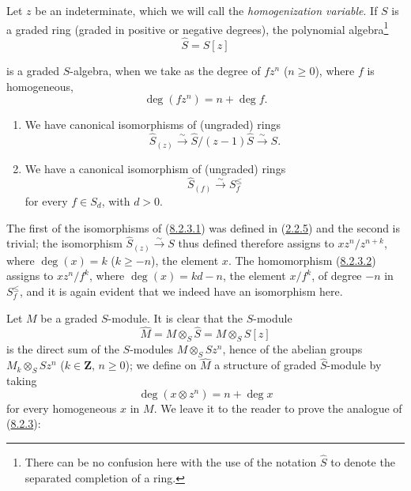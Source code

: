 \begin{env}[8.2.2]
\label{II.8.2.2}
Let $z$ be an indeterminate, which we will call the \emph{homogenization
variable}. If $S$ is a graded ring (graded in positive or
negative degrees), the polynomial algebra\footnote{There can be no
confusion here with the use of the notation $\widehat{S}$ to denote the separated
completion of a ring.}
\begin{equation}
\label{II.8.2.2.1}
  \widehat{S}=S[z]
\tag{8.2.2.1}
\end{equation}

is a graded $S$-algebra, when we take as the degree of $fz^n$ ($n\geq0$), where
$f$ is homogeneous,
\begin{equation}
\label{II.8.2.2.2}
  \deg(fz^n)=n+\deg f.
\tag{8.2.2.2}
\end{equation}
\end{env}

\begin{lemma}[8.2.3]
\label{II.8.2.3}
\begin{enumerate}
\item[\rm(i)] We have canonical isomorphisms of (ungraded) rings
\begin{equation}
\label{II.8.2.3.1}
  \widehat{S}_{(z)}\xrightarrow{\sim}
  \widehat{S}/(z-1)\widehat{S}\xrightarrow{\sim}S.
\tag{8.2.3.1}
\end{equation}
\item[\rm(ii)] We have a canonical isomorphism of (ungraded) rings
\begin{equation}
\label{II.8.2.3.2}
  \widehat{S}_{(f)}\xrightarrow{\sim}S_f^{\leq}
\tag{8.2.3.2}
\end{equation}
for every $f\in S_d$, with $d>0$.
\end{enumerate}
\end{lemma}

The first of the isomorphisms of (\hyperref[II.8.2.3.1]{8.2.3.1}) was
defined in (\hyperref[II.2.2.5]{2.2.5}) and the second is trivial;
the isomorphism $\widehat{S}_{(z)}\xrightarrow{\sim}S$ thus defined therefore
assigns to $xz^n/z^{n+k}$, where $\deg(x)=k$ ($k\geq-n$), the element $x$.
The homomorphism (\hyperref[II.8.2.3.2]{8.2.3.2}) assigns to
$xz^n/f^k$, where $\deg(x)=kd-n$, the element $x/f^k$, of degree $-n$ in
$S_f^{\leq}$, and it is again evident that we indeed have an isomorphism here.

\begin{env}[8.2.4]
\label{II.8.2.4}
Let $M$ be a graded $S$-module. It is clear that the $S$-module
\begin{equation}
\label{II.8.2.4.1}
  \widehat{M}=M\otimes_S\widehat{S}=M\otimes_S S[z]
\tag{8.2.4.1}
\end{equation}
is the direct sum of the $S$-modules $M\otimes_S Sz^n$, hence of the abelian groups
$M_k\otimes_S Sz^n$ ($k\in\mathbf{Z}$, $n\geq0$); we define on
$\widehat{M}$ a structure of graded $\widehat{S}$-module by taking
\begin{equation}
\label{II.8.2.4.2}
  \deg(x\otimes z^n)=n+\deg x
\tag{8.2.4.2}
\end{equation}
for every homogeneous $x$ in $M$. We leave it to the reader to prove
the analogue of (\hyperref[II.8.2.3]{8.2.3}):
\end{env}

